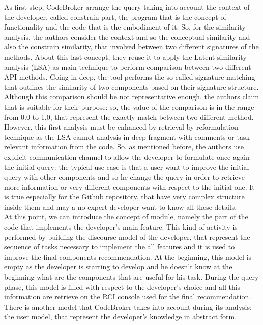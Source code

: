 As first step, CodeBroker arrange the query taking into account the context of the developer, called constrain part, the program that is the concept of functionality and the code that is the embodiment of it. So, for the similarity analysis, the authors consider the context and so the conceptual similarity and also the constrain similarity, that involved between two different signatures of the methods. About this last concept, they reuse it to apply the Latent similarity analysis (LSA) as main technique to perform comparison between two different API methods. Going in deep, the tool performs the so called signature matching that outlines the similarity of two components based on their signature structure. Although this comparison should be not representative enough, the authors claim that is suitable for their purpose: so, the value of the comparison is in the range from 0.0 to 1.0, that represent the exactly match between two different method. However, this first analysis must be enhanced by retrieval by reformulation technique as the LSA cannot analysis in deep fragment with comments or task relevant information from the code. So, as mentioned before, the authors use explicit communication channel to allow the developer to formulate once again the initial query: the typical use case is that a user want to improve the initial query with other components and so he change the query in order to retrieve more information or very different components with respect to the initial one. It is true especially for the Github repository, that have very complex structure inside them and may a no expert developer want to know all these details. \\
At this point, we can introduce the concept of module, namely the part of the code that implements the developer's main feature. This kind of activity is performed by building the discourse model of the developer, that represent the sequence of tasks necessary to implement the all features and it is used to improve the final components recommendation. At the beginning, this model is empty as the developer is starting to develop and he doesn't know at the beginning what are the components that are useful for his task. During the query phase, this model is filled with respect to the developer's choice and all this information are retrieve on the RCI console used for the final recommendation. There is another model that CodeBroker takes into account during its analysis: the user model, that represent the developer's knowledge in abstract form. \\
